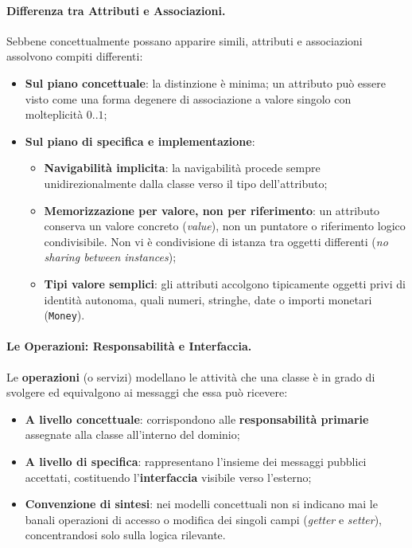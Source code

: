 \documentclass[12pt]{extarticle}
\begin{document}
\paragraph{Differenza tra Attributi e Associazioni.}
Sebbene concettualmente possano apparire simili, attributi e associazioni assolvono compiti differenti:
\begin{itemize}
    \item \textbf{Sul piano concettuale}: la distinzione è minima; un attributo può essere visto come una forma degenere di associazione a valore singolo con molteplicità $0..1$;
    \item \textbf{Sul piano di specifica e implementazione}:
    \begin{itemize}
        \item \textbf{Navigabilità implicita}: la navigabilità procede sempre unidirezionalmente dalla classe verso il tipo dell'attributo;
        \item \textbf{Memorizzazione per valore, non per riferimento}: un attributo conserva un valore concreto (\textit{value}), non un puntatore o riferimento logico condivisibile. Non vi è condivisione di istanza tra oggetti differenti (\textit{no sharing between instances});
        \item \textbf{Tipi valore semplici}: gli attributi accolgono tipicamente oggetti privi di identità autonoma, quali numeri, stringhe, date o importi monetari (\texttt{Money}).
    \end{itemize}
\end{itemize}

\paragraph{Le Operazioni: Responsabilità e Interfaccia.}
Le \textbf{operazioni} (o servizi) modellano le attività che una classe è in grado di svolgere ed equivalgono ai messaggi che essa può ricevere:
\begin{itemize}
    \item \textbf{A livello concettuale}: corrispondono alle \textbf{responsabilità primarie} assegnate alla classe all'interno del dominio;
    \item \textbf{A livello di specifica}: rappresentano l'insieme dei messaggi pubblici accettati, costituendo l'\textbf{interfaccia} visibile verso l'esterno;
    \item \textbf{Convenzione di sintesi}: nei modelli concettuali non si indicano mai le banali operazioni di accesso o modifica dei singoli campi (\textit{getter} e \textit{setter}), concentrandosi solo sulla logica rilevante.
\end{itemize}
\end{document}

